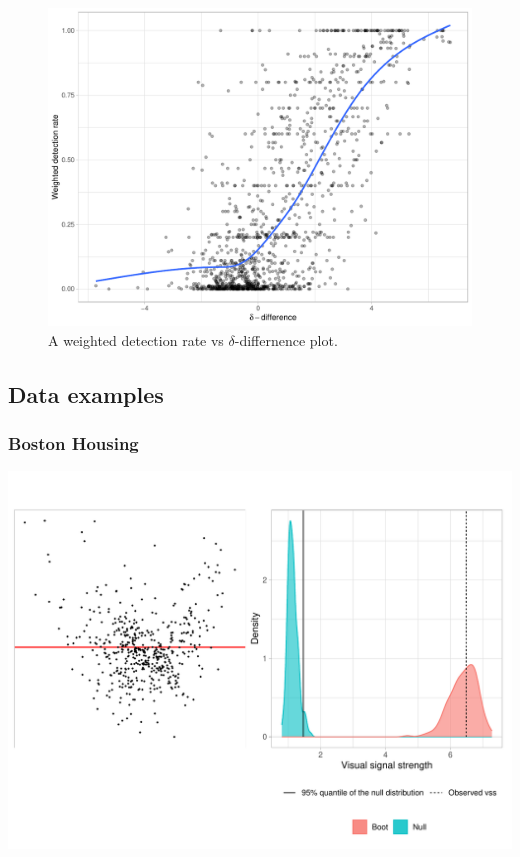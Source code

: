 \documentclass[]{interact}
\theoremstyle{plain}%
\theoremstyle{definition}
\theoremstyle{remark}
\begin{document}
\begin{figure}[!h]

{\centering \includegraphics[width=1\linewidth]{paper_files/figure-latex/delta-1} 

}

\caption{A weighted detection rate vs $\delta$-differnence plot.}\label{fig:delta}
\end{figure}

\hypertarget{data-examples}{%
\subsection{Data examples}\label{data-examples}}

\hypertarget{boston-housing}{%
\subsubsection{Boston Housing}\label{boston-housing}}

\begin{center}\includegraphics[width=1\linewidth]{paper_files/figure-latex/unnamed-chunk-8-1} \end{center}
\end{document}
